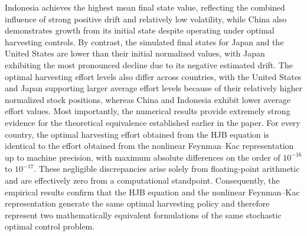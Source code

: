 \documentclass[11pt]{article}
\begin{document}
	\begin{table}[H]
		\centering
		\caption{Controlled SDE simulation summary using real-data-estimated parameters.}
		\label{tab:controlled_summary}
	\end{table}
	
	Indonesia achieves the highest mean final state value, reflecting the combined influence of strong positive drift and relatively low volatility, while China also demonstrates growth from its initial state despite operating under optimal harvesting controls. By contrast, the simulated final states for Japan and the United States are lower than their initial normalized values, with Japan exhibiting the most pronounced decline due to its negative estimated drift. The optimal harvesting effort levels also differ across countries, with the United States and Japan supporting larger average effort levels because of their relatively higher normalized stock positions, whereas China and Indonesia exhibit lower average effort values. Most importantly, the numerical results provide extremely strong evidence for the theoretical equivalence established earlier in the paper. For every country, the optimal harvesting effort obtained from the HJB equation is identical to the effort obtained from the nonlinear Feynman--Kac representation up to machine precision, with maximum absolute differences on the order of $10^{-16}$ to $10^{-17}$. These negligible discrepancies arise solely from floating-point arithmetic and are effectively zero from a computational standpoint. Consequently, the empirical results confirm that the HJB equation and the nonlinear Feynman--Kac representation generate the same optimal harvesting policy and therefore represent two mathematically equivalent formulations of the same stochastic optimal control problem.
	
\end{document}
